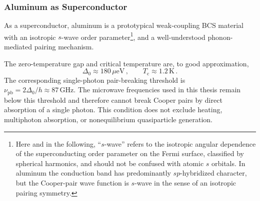         \subsubsection*{Aluminum as Superconductor}

            As a superconductor, aluminum is a prototypical weak-coupling BCS material with an isotropic $s$-wave order parameter\footnote{
                Here and in the following, ``$s$-wave'' refers to the isotropic angular dependence of the superconducting order parameter on the Fermi surface, classified by spherical harmonics, and should not be confused with atomic $s$ orbitals. In aluminum the conduction band has predominantly $sp$-hybridized character, but the Cooper-pair wave function is $s$-wave in the sense of an isotropic pairing symmetry.
                },
            and a well-understood phonon-mediated pairing mechanism.

            The zero-temperature gap and critical temperature are, to good approximation,
            \begin{equation}
                \Delta_0 \approx 180\,\mu\mathrm{eV}\,,\qquad
                T_\mathrm{c} \approx 1.2\,\mathrm{K}\,.
                \label{eq:platform:aluminum}
            \end{equation}
            The corresponding single-photon pair-breaking threshold is $\nu_\mathrm{pb}=2\Delta_0/h\approx 87\,\mathrm{GHz}$. The microwave frequencies used in this thesis remain below this threshold and therefore cannot break Cooper pairs by direct absorption of a single photon. This condition does not exclude heating, multiphoton absorption, or nonequilibrium quasiparticle generation. \cite{tinkham_introduction_2004, murray_material_2021}

